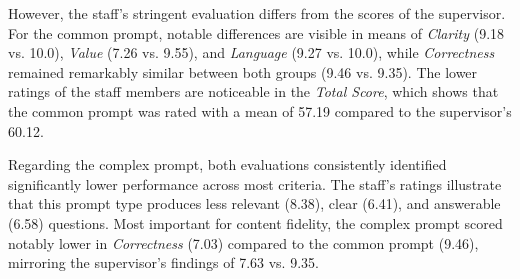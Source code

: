 \begin{table}[htbp]
    \centering
    \caption{Staff-based qualitative Analysis Results by Prompt Type (Exp1a).}
    \label{tab:exp1a-prompt-results-staff}
\end{table}

\pagebreak

However, the staff's stringent evaluation differs from the scores of the supervisor. For the common prompt, notable differences are visible in means of \textit{Clarity} (9.18 vs. 10.0), \textit{Value} (7.26 vs. 9.55), and \textit{Language} (9.27 vs. 10.0), while \textit{Correctness} remained remarkably similar between both groups (9.46 vs. 9.35). The lower ratings of the staff members are noticeable in the \textit{Total Score}, which shows that the common prompt was rated with a mean of 57.19 compared to the supervisor's 60.12.

Regarding the complex prompt, both evaluations consistently identified significantly lower performance across most criteria. The staff's ratings illustrate that this prompt type produces less relevant (8.38), clear (6.41), and answerable (6.58) questions. Most important for content fidelity, the complex prompt scored notably lower in \textit{Correctness} (7.03) compared to the common prompt (9.46), mirroring the supervisor's findings of 7.63 vs. 9.35.

